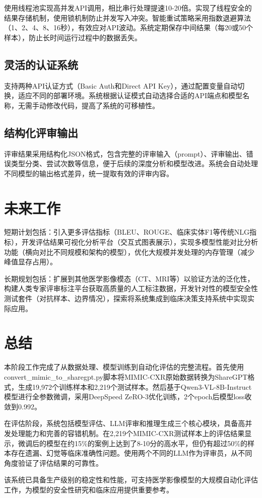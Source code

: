 \documentclass[12pt,a4paper]{article}
\begin{document}
使用线程池实现高并发API调用，相比串行处理提速10-20倍。实现了线程安全的结果存储机制，使用锁机制防止并发写入冲突。智能重试策略采用指数退避算法（1、2、4、8、16秒），有效应对API波动。系统定期保存中间结果（每20或50个样本），防止长时间运行过程中的数据丢失。

\subsection{灵活的认证系统}

支持两种API认证方式（Basic Auth和Direct API Key），通过配置变量自动切换，适应不同的部署环境。系统根据认证模式自动选择合适的API端点和模型名称，无需手动修改代码，提高了系统的可移植性。

\subsection{结构化评审输出}

评审结果采用结构化JSON格式，包含完整的评审输入（prompt）、评审输出、错误类型分类、尝试次数等信息，便于后续的深度分析和模型改进。系统会自动处理不同模型的输出格式差异，统一提取有效的评审内容。

\section{未来工作}

短期计划包括：引入更多评估指标（BLEU、ROUGE、临床实体F1等传统NLG指标），开发评估结果可视化分析平台（交互式图表展示），实现多模型性能对比分析功能（横向对比不同规模和架构的模型），优化大规模并发处理的内存管理（减少峰值显存占用）。

长期规划包括：扩展到其他医学影像模态（CT、MRI等）以验证方法的泛化性，构建人类专家评审标注平台获取高质量的人工标注数据，开发针对性的模型安全性测试套件（对抗样本、边界情况），探索将系统集成到临床决策支持系统中实现实际应用。

\section{总结}

本阶段工作完成了从数据处理、模型训练到自动化评估的完整流程。首先使用convert\_mimic\_to\_sharegpt.py脚本将MIMIC-CXR原始数据转换为ShareGPT格式，生成19,972个训练样本和2,219个测试样本。然后基于Qwen3-VL-8B-Instruct模型进行全参数微调，采用DeepSpeed ZeRO-3优化训练，2个epoch后模型loss收敛到0.992。

在评估阶段，系统包括模型评估、LLM评审和推理生成三个核心模块，具备高并发处理能力和完善的容错机制。在2,219个MIMIC-CXR测试样本上的评估结果显示，微调后的模型在约15\%的案例上达到了8-10分的高水平，但仍有超过50\%的样本存在遗漏、幻觉等临床准确性问题。使用两个不同的LLM作为评审员，从不同角度验证了评估结果的可靠性。

该系统已具备生产级别的稳定性和性能，可支持医学影像模型的大规模自动化评估工作，为模型的安全性研究和临床应用提供重要参考。
\end{document}
